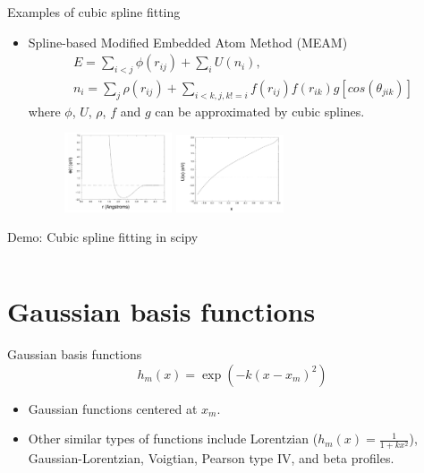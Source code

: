 \documentclass[aspectratio=169]{beamer}
\begin{document}
\begin{frame}{Examples of cubic spline fitting}
    \begin{itemize}
        \item Spline-based Modified Embedded Atom Method (MEAM)
        \begin{eqnarray*}
            E = \sum_{i <j} \phi(r_{ij}) + \sum_i U(n_i), \\
            n_i = \sum_j \rho(r_{ij}) + \sum_{i < k, j,k!=i} f(r_{ij}) f(r_{ik})g[cos(\theta_{jik})]
        \end{eqnarray*}
        where $\phi$, $U$, $\rho$, $f$ and $g$ can be approximated by cubic splines. 
        \begin{figure}
            \centering
            \includegraphics[width=0.3\textwidth]{figures/meam-phi.png}
            \includegraphics[width=0.3\textwidth]{figures/meam-u.png}

        \end{figure}
    \end{itemize}
\end{frame} 


\begin{frame}[fragile]{Demo: Cubic spline fitting in scipy}
    \inputminted{python}{example_sklearn_spline.py}
\end{frame} 


\section{Gaussian basis functions}


\begin{frame}{Gaussian basis functions}
    \begin{equation*}
        h_m(x) = \exp(-k(x - x_m) ^ 2)
    \end{equation*}
    \begin{itemize}
        \item Gaussian functions centered at $x_m$.
        \item Other similar types of functions include Lorentzian ($h_m(x) = \frac{1}{1 + kx^2}$), Gaussian-Lorentzian, Voigtian, Pearson type IV, and beta profiles.
    \end{itemize}
\end{frame} 
\end{document}
